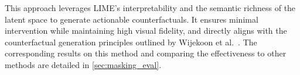 This approach leverages LIME’s interpretability and the semantic richness of the latent space to generate actionable counterfactuals. It ensures minimal intervention while maintaining high visual fidelity, and directly aligns with the counterfactual generation principles outlined by Wijekoon et al.~\cite{WijekoonWNMPC21}. The corresponding results on this method and comparing the effectiveness to other methods are detailed in \cref{sec:masking_eval}.







